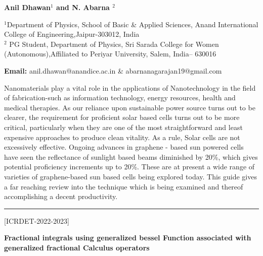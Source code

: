 \documentclass[twoside,11pt]{amsart}
\begin{document}
\centerline{\textbf{Anil Dhawan$^{1}$ and N. Abarna
$^{2}$   }}
\vskip 5mm
\begin{flushleft}
$^{1}$Department of Physics, School of Basic \& Applied Sciences, Anand International College of Engineering,Jaipur-303012, India\\
$^{2}$ PG Student, Department of Physics, Sri Sarada College for Women (Autonomous),Affiliated to Periyar University, Salem, India– 630016
\vskip 5mm
\end{flushleft}
\vskip 2mm
\begin{flushleft}
{\bf Email:}  anil.dhawan@anandice.ac.in
 \&  abarnanagarajan19@gmail.com
\end{flushleft}
\vskip 5mm
Nanomaterials play a vital role in the applications
of Nanotechnology in the field of fabrication-such
as information technology, energy resources,
health and medical therapies. As our reliance upon
sustainable power source turns out to be clearer,
the requirement for proficient solar based cells
turns out to be more critical, particularly when
they are one of the most straightforward and least
expensive approaches to produce clean vitality. As
a rule, Solar cells are not excessively effective.
Ongoing advances in graphene - based sun
powered cells have seen the reflectance of sunlight
based beams diminished by 20\%, which gives
potential proficiency increments up to 20\%. These
are at present a wide range of varieties of
graphene-based sun based cells being explored
today. This guide gives a far reaching review into
the technique which is being examined and thereof
accomplishing a decent productivity.
\vskip 2mm
\rule{\textwidth}{0.5pt}
\vskip 5mm
\begin{flushleft}
\centerline{[ICRDET-2022-2023]}
\end{flushleft}
\begin{center}\bf\LARGE
Fractional integrals using generalized bessel
Function associated with generalized fractional
Calculus operators
\end{center}
\vskip 5mm
\end{document}
